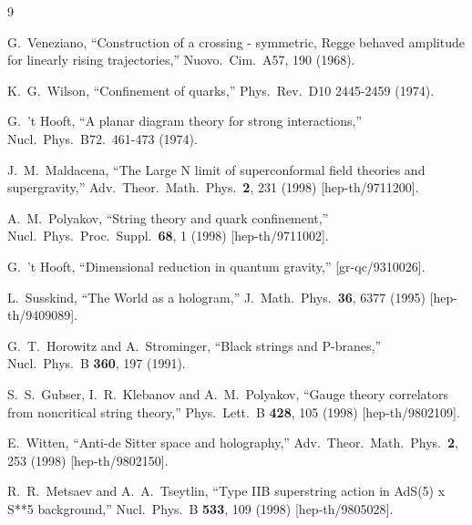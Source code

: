 \documentclass[a4paper,11pt]{article}
\numberwithin{equation}{section}
\begin{document}
\begin{thebibliography} {9}

  G.~Veneziano, 
  ``Construction of a crossing - symmetric, Regge behaved amplitude for linearly rising trajectories,'' 
  Nuovo.\ Cim.\ A57, 190 (1968).

  K.~G.~Wilson,
  ``Confinement of quarks,''
  Phys.\ Rev.\ D10 2445-2459 (1974).

  G.~'t Hooft, 
  ``A planar diagram theory for strong interactions,'' 
  Nucl.\ Phys.\ B72.\ 461-473 (1974).

  J.~M.~Maldacena,
  ``The Large N limit of superconformal field theories and supergravity,''
  Adv.\ Theor.\ Math.\ Phys.\  {\bf 2}, 231 (1998)
  [hep-th/9711200].

  A.~M.~Polyakov,
  ``String theory and quark confinement,''
  Nucl.\ Phys.\ Proc.\ Suppl.\  {\bf 68}, 1 (1998)
  [hep-th/9711002].

  G.~'t Hooft,
  ``Dimensional reduction in quantum gravity,''
  [gr-qc/9310026].

  L.~Susskind,
  ``The World as a hologram,''
  J.\ Math.\ Phys.\  {\bf 36}, 6377 (1995)
  [hep-th/9409089].

  G.~T.~Horowitz and A.~Strominger,
  ``Black strings and P-branes,''
  Nucl.\ Phys.\ B {\bf 360}, 197 (1991).

  S.~S.~Gubser, I.~R.~Klebanov and A.~M.~Polyakov,
  ``Gauge theory correlators from noncritical string theory,''
  Phys.\ Lett.\ B {\bf 428}, 105 (1998)
  [hep-th/9802109].

  E.~Witten,
  ``Anti-de Sitter space and holography,''
  Adv.\ Theor.\ Math.\ Phys.\  {\bf 2}, 253 (1998)
  [hep-th/9802150].

  R.~R.~Metsaev and A.~A.~Tseytlin,
  ``Type IIB superstring action in AdS(5) x S**5 background,''
  Nucl.\ Phys.\ B {\bf 533}, 109 (1998)
  [hep-th/9805028].


\end{thebibliography}
\end{document}
